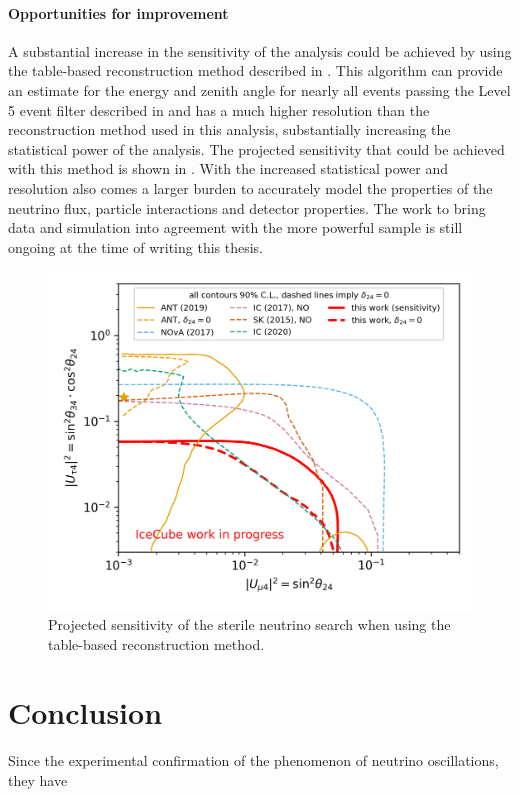 \subsubsection{Opportunities for improvement}
A substantial increase in the sensitivity of the analysis could be achieved by using the table-based reconstruction method described in \cite{lowen-reco-paper}. This algorithm can provide an estimate for the energy and zenith angle for nearly all events passing the Level 5 event filter described in  and has a much higher resolution than the reconstruction method used in this analysis, substantially increasing the statistical power of the analysis. The projected sensitivity that could be achieved with this method is shown in . With the increased statistical power and resolution also comes a larger burden to accurately model the properties of the neutrino flux, particle interactions and detector properties. The work to bring data and simulation into agreement with the more powerful sample is still ongoing at the time of writing this thesis.
\begin{figure}
    \centering
    \includegraphics{figures/summary/Sterile_mixing_sensitivity_90pct_retro.png}
    \caption{Projected sensitivity of the sterile neutrino search when using the table-based reconstruction method.\label{fig:retro-sensitivity}}
\end{figure}

\chapter{Conclusion}

Since the experimental confirmation of the phenomenon of neutrino oscillations, they have
